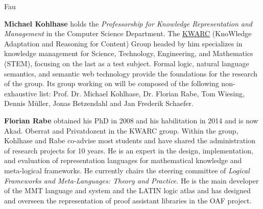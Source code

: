 \begin{sitedescription}{Fau}
\begin{compactitem}
\item\textbf{Michael Kohlhase} holds the \emph{Professorship for Knowledge Representation and Management} in the Computer Science Department.
The \href{http://kwarc.info}{KWARC} (KnoWledge Adaptation and Reasoning for Content) Group headed by him specializes in knowledge management for Science, Technology, Engineering, and Mathematics (STEM), focusing on the last as a test subject.
Formal logic, natural language semantics, and semantic web technology provide the foundations for the research of the group.
Its group working on \pn will be composed of the following non-exhaustive list: Prof. Dr. Michael Kohlhase, Dr. Florian Rabe, Tom Wiesing, Dennis M\"uller, Jonas Betzendahl and Jan Frederik Schaefer.

\item\textbf{Florian Rabe} obtained his PhD in 2008 and his habilitation in 2014 and is now Akad. Oberrat and Privatdozent in the KWARC group.
Within the group, Kohlhase and Rabe co-advise most students and have shared the administration of research projects for 10 years.
He is an expert in the design, implementation, and evaluation of representation languages for mathematical knowledge and meta-logical frameworks.
He currently chairs the steering committee of \emph{Logical Frameworks and Meta-Languages: Theory and Practice}.
He is the main developer of the MMT language and system and the LATIN logic atlas and has designed and overseen the representation of proof assistant libraries in the OAF project.
\end{compactitem}

\end{sitedescription}

